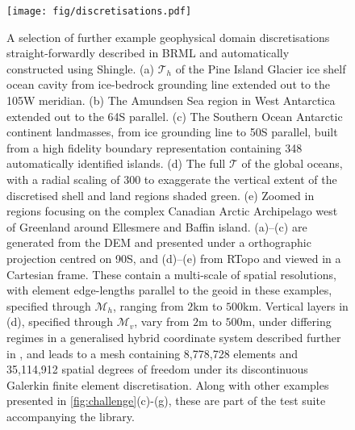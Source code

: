 \documentclass[a4paper, 10pt]{book}
\providecommand{\shingle}{Shingle\xspace}
\providecommand{\brml}{BRML\xspace}
\providecommand{\brep}{boundary representation\xspace}
\begin{document}
\begin{figure}[!h]
\begin{center}
\texttt{[image: fig/discretisations.pdf]}
\end{center}
\caption{
A selection of further example geophysical domain discretisations
straight-forwardly
described in \brml and
automatically
constructed using \shingle.
%
(a) $\mathcal{T}_h$ of the Pine Island Glacier ice shelf ocean cavity from ice-bedrock grounding line extended out to the
105\degree W meridian.
%
(b) The Amundsen Sea region in West Antarctica extended out to the 64\degree S parallel.
(c) The Southern Ocean Antarctic continent landmasses, from ice grounding line to 50\degree S parallel,
built from a high fidelity \brep containing 348 automatically identified islands.
%
%
(d) The full $\mathcal{T}$ of the global oceans,
with a radial scaling of 300 to exaggerate the vertical extent of the discretised shell
and land regions shaded green.
(e) Zoomed in regions focusing on the complex Canadian Arctic Archipelago west of Greenland around Ellesmere and Baffin island.
%
%
(a)--(c) are generated from the \cite{gebco} DEM and presented under a
orthographic projection centred on 90\degree S,
and (d)--(e) from RTopo \citep{rtopo} and viewed in a Cartesian frame.
These contain a multi-scale of spatial resolutions, with element edge-lengths parallel to the geoid in these examples,
specified through $\mathcal{M}_h$,
ranging from 
$2\textrm{km}$
to
$500\textrm{km}$.
%
%
Vertical layers in (d), specified through
$\mathcal{M}_v$,
vary from
%
$2\textrm{m}$
to
$500\textrm{m}$,
under differing regimes in a generalised hybrid coordinate system described further in \cite{candybrep},
and leads to a mesh containing 8,778,728 elements and 35,114,912 spatial degrees of freedom under its discontinuous Galerkin finite element discretisation.
%
Along with other examples presented in \cref{fig:challenge}(c)-(g),
these are part of the test suite accompanying the library.
%
%
}
\label{fig:discretisations}
\end{figure}
%
\end{document}
